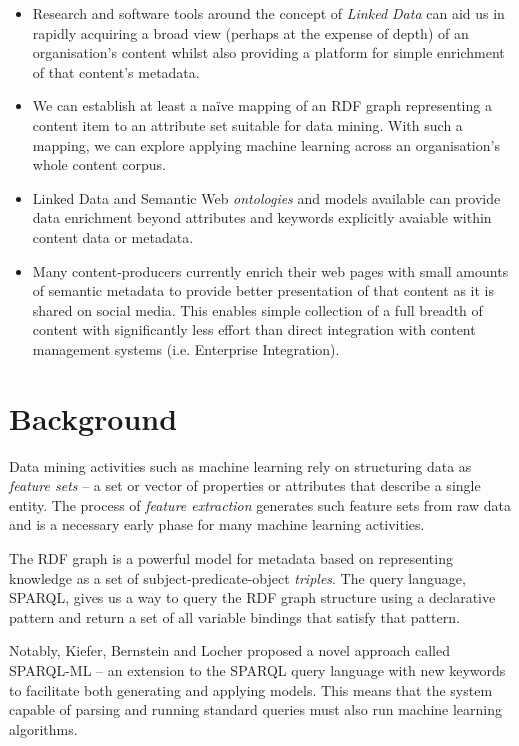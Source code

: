 \documentclass{sig-alternate-05-2015}
\begin{document}
\begin{itemize}

\item Research and software tools around the concept of \emph{Linked Data} can
aid us in rapidly acquiring a broad view (perhaps at the expense of depth) of an
organisation's content whilst also providing a platform for simple enrichment of
that content's metadata.

\item We can establish at least a na\"ive mapping of an RDF graph representing a
content item to an attribute set suitable for data mining. With such a mapping,
we can explore applying machine learning across an organisation's whole content
corpus.

\item Linked Data and Semantic Web \emph{ontologies} and models available can
provide data enrichment beyond attributes and keywords explicitly avaiable
within content data or metadata.

\item Many content-producers currently enrich their web pages with small
amounts of semantic metadata to provide better presentation of that content
as it is shared on social media. This enables simple collection of a full
breadth of content with significantly less effort than direct integration
with content management systems (i.e. Enterprise Integration).

\end{itemize}

\section{Background}

Data mining activities such as machine learning rely on structuring data as
\emph{feature sets}\cite{bishop2006pattern} -- a set or vector of properties or
attributes that describe a single entity.
The process of \emph{feature extraction}
generates such feature sets from raw data and is a necessary early phase for
many machine learning activities.

The RDF graph is a powerful model
for metadata based on representing knowledge as a set of
subject-predicate-object \emph{triples}. The query language, SPARQL, gives us a
way to query the RDF graph structure using a declarative pattern and return a
set of all variable bindings that satisfy that pattern.

Notably, Kiefer, Bernstein and Locher\cite{kiefer2008adding} proposed a novel
approach called SPARQL-ML -- an extension to the
SPARQL\cite{segaran2009programming} query language with new keywords to
facilitate both generating and applying models. This means that the system
capable of parsing and running standard queries must also run machine learning
algorithms.
\end{document}
